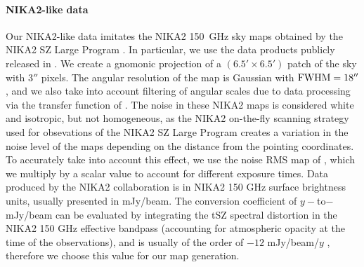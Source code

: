 \paragraph{NIKA2-like data}  %
Our NIKA2-like data imitates the NIKA2 150~GHz sky maps obtained by the NIKA2 SZ Large Program \citep{mayet_cluster_2020, perotto_nika2_2021}.
In particular, we use the data products publicly released in \citet{keruzore_exploiting_2020}.
We create a gnomonic projection of a $(6.5' \times 6.5')$ patch of the sky with $3''$ pixels.
The angular resolution of the map is Gaussian with ${\rm FWHM} = 18''$, and we also take into account filtering of angular scales due to data processing via the transfer function of \citet{keruzore_exploiting_2020}.
The noise in these NIKA2 maps is considered white and isotropic, but not homogeneous, as the NIKA2 on-the-fly scanning strategy used for obsevations of the NIKA2 SZ Large Program creates a variation in the noise level of the maps depending on the distance from the pointing coordinates.
To accurately take into account this effect, we use the noise RMS map of \citet{keruzore_exploiting_2020}, which we multiply by a scalar value to account for different exposure times.
Data produced by the NIKA2 collaboration is in NIKA2 150 GHz surface brightness units, usually presented in mJy/beam.
The conversion coefficient of $y-$to$-$mJy/beam can be evaluated by integrating the tSZ spectral distortion in the NIKA2 150 GHz effective bandpass (accounting for atmospheric opacity at the time of the observations), and is usually of the order of $-12$ mJy/beam/$y$ \citep[\eg][]{keruzore_exploiting_2020}, therefore we choose this value for our map generation.



